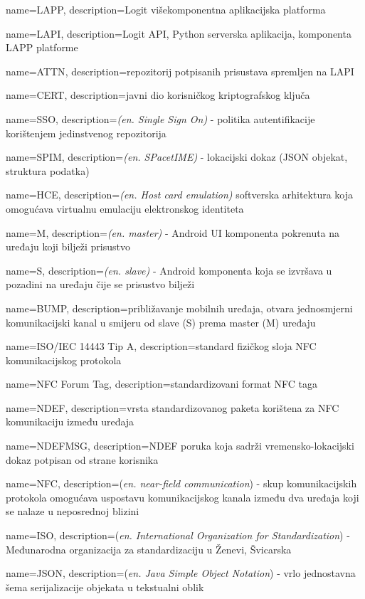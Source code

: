 {name={LAPP}, description={Logit višekomponentna aplikacijska platforma}}

{name={LAPI}, description={Logit API, Python serverska aplikacija, komponenta LAPP platforme}}

{name={ATTN}, description={repozitorij potpisanih prisustava spremljen na LAPI}}

{name={CERT}, description={javni dio korisničkog kriptografskog ključa}}

{name={SSO}, description={\textit{(en. Single Sign On)} - politika autentifikacije korištenjem jedinstvenog repozitorija}}

{name={SPIM}, description={\textit{(en. SPacetIME)} - lokacijski dokaz (JSON objekat, struktura podatka)}}

{name={HCE}, description={\textit{(en. Host card emulation)} softverska arhitektura koja omogućava virtualnu emulaciju elektronskog identiteta}}

{name={M}, description={\textit{(en. master)} - Android UI komponenta pokrenuta na uređaju koji bilježi prisustvo}}

{name={S}, description={\textit{(en. slave)} - Android komponenta koja se izvršava u pozadini na uređaju čije se prisustvo bilježi}}

{name={BUMP}, description={približavanje mobilnih uređaja, otvara jednosmjerni komunikacijski kanal u smijeru od slave (S) prema master (M) uređaju}}

{name={ISO/IEC 14443 Tip A}, description={standard fizičkog sloja NFC komunikacijskog protokola}}

{name={NFC Forum Tag}, description={standardizovani format NFC taga}}

{name={NDEF}, description={vrsta standardizovanog paketa korištena za NFC komunikaciju između uređaja}}

{name={NDEFMSG}, description={NDEF poruka koja sadrži vremensko-lokacijski dokaz potpisan od strane korisnika}}

{name={NFC}, description={(\textit{en. near-field communication}) - skup komunikacijskih protokola omogućava uspostavu komunikacijskog kanala između dva uređaja koji se nalaze u neposrednoj blizini}}

{name={ISO}, description={(\textit{en. International Organization for Standardization}) - Međunarodna organizacija za standardizaciju u Ženevi, Švicarska}}

{name={JSON}, description={(\textit{en. Java Simple Object Notation}) - vrlo jednostavna šema serijalizacije objekata u tekstualni oblik}}